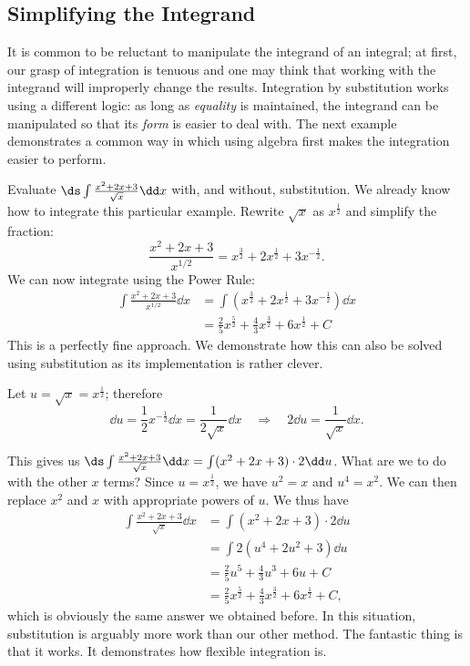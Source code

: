 \subsection{Simplifying the Integrand}

It is common to be reluctant to manipulate the integrand of an integral; at first, our grasp of integration is tenuous and one may think that working with the integrand will improperly change the results. Integration by substitution works using a different logic: as long as \emph{equality} is maintained, the integrand can be manipulated so that its \emph{form} is easier to deal with. The next example demonstrates a common way in which using algebra first makes the integration easier to perform.

\begin{example}\label{ex_sub11}%
Evaluate $\ds\int \frac{x^2+2x+3}{\sqrt{x}}\dd x$ with, and without, substitution.
\solution
We already know how to integrate this particular example. Rewrite $\sqrt{x}$ as $x^\frac12$ and simplify the fraction:
	\[ \frac{x^2+2x+3}{x^{1/2}} = x^\frac32 + 2x^\frac12 + 3x^{-\frac12}.\]
We can now integrate using the Power Rule:
\begin{align*}
	\int \frac{x^2+2x+3}{x^{1/2}}\dd x &= \int\left(x^\frac32 + 2x^\frac12 + 3x^{-\frac12}\right)\dd x\\
	&=	\frac25x^\frac52 + \frac43x^\frac32 + 6x^\frac12 + C
\end{align*}
This is a perfectly fine approach. We demonstrate how this can also be solved using substitution as its implementation is rather clever.

Let $u = \sqrt{x} = x^\frac12$; therefore 
\[\dd u = \frac12x^{-\frac12}\dd x = \frac{1}{2\sqrt{x}}\dd x \quad \Rightarrow \quad 2\dd u = \frac{1}{\sqrt{x}}\dd x.\]
		
This gives us $\ds \int \frac{x^2+2x+3}{\sqrt{x}}\dd x = \int (x^2+2x+3)\cdot2\dd u$. What are we to do with the other $x$ terms? Since $u=x^{\frac12}$, we have $u^2=x$ and $u^4=x^2$. We can then replace $x^2$ and $x$ with appropriate powers of $u$. We thus have
\begin{align*}
	\int \frac{x^2+2x+3}{\sqrt{x}}\dd x
	&= \int (x^2+2x+3)\cdot2\dd u\\
	&= \int 2(u^4 + 2u^2 + 3)\dd u \\
	&= \frac25u^5 + \frac43u^3 + 6u + C \\
	&= \frac25x^\frac52 + \frac43x^\frac32 + 6x^\frac12+C,
\end{align*}
which is obviously the same answer we obtained before. In this situation, substitution is arguably more work than our other method. The fantastic thing is that it works. It demonstrates how flexible integration is.
\end{example}


